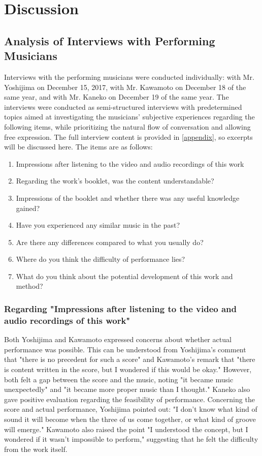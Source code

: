 \section{Discussion}

\subsection{Analysis of Interviews with Performing Musicians}

Interviews with the performing musicians were conducted individually: with Mr. Yoshijima on December 15, 2017, with Mr. Kawamoto on December 18 of the same year, and with Mr. Kaneko on December 19 of the same year. The interviews were conducted as semi-structured interviews with predetermined topics aimed at investigating the musicians' subjective experiences regarding the following items, while prioritizing the natural flow of conversation and allowing free expression. The full interview content is provided in \ref{appendix}, so excerpts will be discussed here. The items are as follows:

\begin{enumerate}
  \item Impressions after listening to the video and audio recordings of this work
  \item Regarding the work's booklet, was the content understandable?
	\item Impressions of the booklet and whether there was any useful knowledge gained?
  \item Have you experienced any similar music in the past?
	\item Are there any differences compared to what you usually do?
	\item Where do you think the difficulty of performance lies?
  \item What do you think about the potential development of this work and method?
\end{enumerate}

\subsubsection{Regarding "Impressions after listening to the video and audio recordings of this work"}

Both Yoshijima and Kawamoto expressed concerns about whether actual performance was possible. This can be understood from Yoshijima's comment that "there is no precedent for such a score" and Kawamoto's remark that "there is content written in the score, but I wondered if this would be okay." However, both felt a gap between the score and the music, noting "it became music unexpectedly" and "it became more proper music than I thought." Kaneko also gave positive evaluation regarding the feasibility of performance. Concerning the score and actual performance, Yoshijima pointed out: "I don't know what kind of sound it will become when the three of us come together, or what kind of groove will emerge." Kawamoto also raised the point "I understood the concept, but I wondered if it wasn't impossible to perform," suggesting that he felt the difficulty from the work itself.

